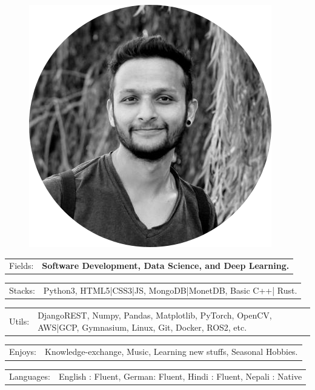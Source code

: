 \documentclass[10pt,A4]{article}
\newcommand{\tzlarrow}{(0,0) -- (0.2,0) -- (0.3,0.2) -- (0.2,0.4) -- (0,0.4) -- (0.1,0.2) -- cycle;}
\newcommand{\larrow}[1]
{\begin{tikzpicture}[scale=0.58]
	 \filldraw[fill=#1!100,draw=#1!100!black]  \tzlarrow
 \end{tikzpicture}
}
\newcommand{\metasection}[2]
{
\begin{tabular*}{1\textwidth}{p{2.4cm} p{11cm}}
\larrow{bgcol}	\normalsize{\textcolor{sectcol}{#1}}&#2\\[12pt]
\end{tabular*}
}
\begin{document}
\pagestyle{fancy}


\vspace{-20.55pt}


\hspace{-0.25\linewidth}\colorbox{bgcol}{}



\begin{figure}[H]
\begin{flushright}
	\includegraphics[width=0.20\linewidth]{profile.png}	%
\end{flushright}
\end{figure}



\vspace{-130pt}

\metasection{Fields:}{\textbf{Software Development, Data Science, and Deep Learning.}}
\metasection{Stacks:}{Python3, HTML5|CSS3|JS, MongoDB|MonetDB, Basic C++| Rust.}
\vspace{5pt}
\metasection{Utils:}{DjangoREST, Numpy, Pandas, Matplotlib, PyTorch, OpenCV, AWS|GCP,
	Gymnasium, Linux, Git, Docker, ROS2, etc. }
\metasection{Enjoys:}{Knowledge-exchange, Music, Learning new stuffs, Seasonal Hobbies. }
\metasection{Languages:}{English : Fluent, German: Fluent, Hindi : Fluent, Nepali : Native}
\end{document}
